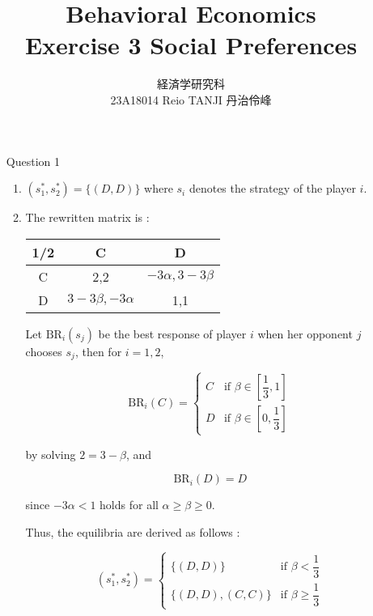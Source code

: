 \documentclass{jsarticle}
\begin{document}
\title{Behavioral Economics \\
Exercise 3 Social Preferences}
\author{経済学研究科　 \\ 23A18014 Reio TANJI 丹治伶峰}
\date{}
\maketitle

\begin{enumerate}

\item [Question 1]

\begin{enumerate}

\item $(s_1^*,s_2^*)=\{(D,D)\}$ where $s_i$ denotes the strategy of the player $i$.

\item

The rewritten matrix is :

\begin{center}

\begin{tabular}{|c|c|c|} \hline
1/2 & C & D \\ \hline
C & 2,2 & $-3\alpha, 3-3\beta$ \\ \hline
D & $3-3\beta, -3\alpha$ & 1,1 \\ \hline
\end{tabular}

\end{center}

Let $\text{BR}_i(s_j)$ be the best response of player $i$ when her opponent $j$ chooses $s_j$, then for $i=1,2$,

\[\text{BR}_i(C)=\begin{cases}
C & \text{if } \beta \in \left[\dfrac{1}{3},1 \right] \\
D & \text{if } \beta \in \left[ 0,\dfrac{1}{3} \right] 
\end{cases}\]

by solving $2=3-\beta$, and

\[\text{BR}_i(D)=D \]

since $-3\alpha < 1$ holds for all $\alpha \geq \beta \geq 0$.

Thus, the equilibria are derived as follows :

\[(s_1^*,s_2^*)=\begin{cases}
\{(D,D)\}  & \text{if } \beta < \dfrac{1}{3} \\
\{(D,D),(C,C) \} & \text{if } \beta \geq \dfrac{1}{3}
\end{cases} \]


\end{enumerate}
\end{enumerate}
\end{document}
